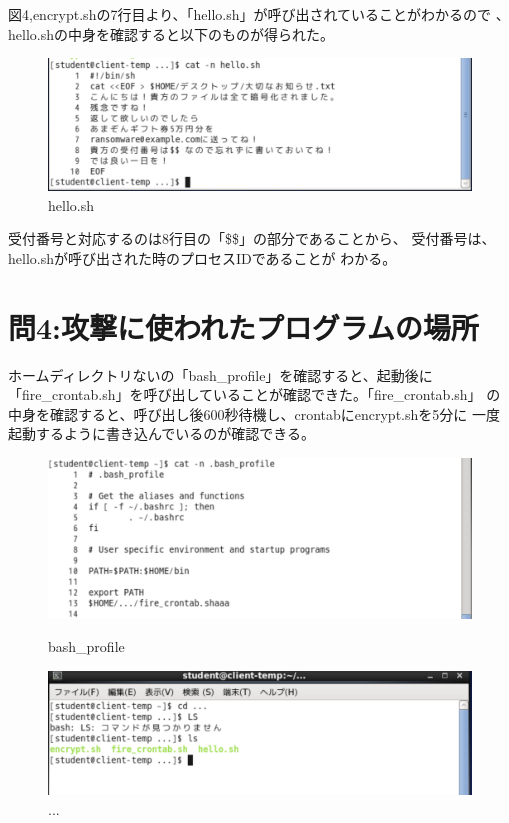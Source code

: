 \documentclass[dvipdfmx,autodetect-engine,titlepage]{jsarticle}
\begin{document}
図4,encrypt.shの7行目より、「hello.sh」が呼び出されていることがわかるので
、hello.shの中身を確認すると以下のものが得られた。

\begin{figure}[h]
  \centering
  \includegraphics[scale=0.7]{pic8.png}
  \caption{hello.sh}
\end{figure}

受付番号と対応するのは8行目の「\$\$」の部分であることから、
受付番号は、hello.shが呼び出された時のプロセスIDであることが
わかる。

\section{問4:攻撃に使われたプログラムの場所}

ホームディレクトリないの「bash\_profile」を確認すると、起動後に
「fire\_crontab.sh」を呼び出していることが確認できた。「fire\_crontab.sh」
の中身を確認すると、呼び出し後600秒待機し、crontabにencrypt.shを5分に
一度起動するように書き込んでいるのが確認できる。

\begin{figure}[h]
  \centering
  \begin{minipage}[b]{0.45\linewidth}
  \begin{center}
    \includegraphics[keepaspectratio,scale=0.35]{pic9.png}
    \end{center}
    \caption{bash\_profile}
  \end{minipage}
  \begin{minipage}[b]{0.45\linewidth}
  \begin{center}
    \includegraphics[keepaspectratio,scale=0.35]{pic10.png}
    \end{center}
    \caption{...}
  \end{minipage}
\end{figure}
\end{document}
